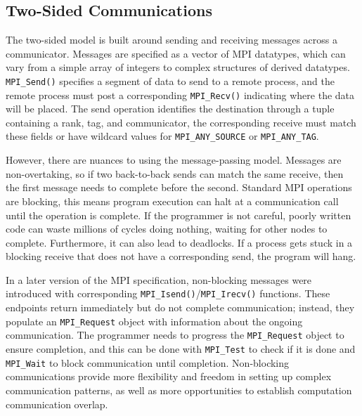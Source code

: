 \subsection{Two-Sided Communications}
The two-sided model is built around sending and receiving messages across a communicator.
Messages are specified as a vector of \gls{MPI} datatypes, which can vary from a simple array of integers to complex structures of derived datatypes.
\texttt{MPI\_Send()} specifies a segment of data to send to a remote process, and the remote process must post a corresponding \texttt{MPI\_Recv()} indicating where the data will be placed. 
The send operation identifies the destination through a tuple containing a rank, tag, and communicator, the corresponding receive must match these fields or have wildcard values for \texttt{MPI\_ANY\_SOURCE} or \texttt{MPI\_ANY\_TAG}.

However, there are nuances to using the message-passing model.
Messages are non-overtaking, so if two back-to-back sends can match the same receive, then the first message needs to complete before the second.
Standard \gls{MPI} operations are blocking, this means program execution can halt at a communication call until the operation is complete.
If the programmer is not careful, poorly written code can waste millions of cycles doing nothing, waiting for other nodes to complete.
Furthermore, it can also lead to deadlocks.
If a process gets stuck in a blocking receive that does not have a corresponding send, the program will hang.

In a later version of the \gls{MPI} specification, non-blocking messages were introduced with corresponding \texttt{MPI\_Isend()}/\texttt{MPI\_Irecv()} functions.
These endpoints return immediately but do not complete communication; instead, they populate an \texttt{MPI\_Request} object with information about the ongoing communication.
The programmer needs to progress the \texttt{MPI\_Request} object to ensure completion, and this can be done with \texttt{MPI\_Test} to check if it is done and \texttt{MPI\_Wait} to block communication until completion.
Non-blocking communications provide more flexibility and freedom in setting up complex communication patterns, as well as more opportunities to establish computation communication overlap.

